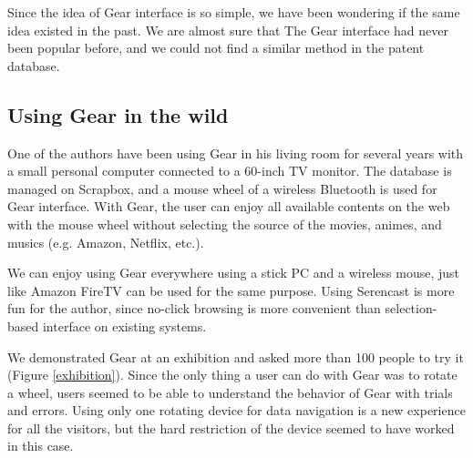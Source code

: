 \documentclass[conference]{IEEEtran}
\def\SC{Serencast}
\def\SB{Scrapbox}
\begin{document}
Since the idea of Gear interface is so simple,
we have been wondering if the same idea existed in the past.
We are almost sure that The Gear interface had never been popular before,
and we could not find a similar method in the patent database.

\subsection{Using Gear in the wild}

One of the authors have been using Gear in his living room for several years
with a small personal computer connected to a 60-inch TV monitor.
The database is managed on {\SB}, and
a mouse wheel of a wireless Bluetooth is used for Gear interface.
With Gear, the user can enjoy all available contents on the web with the mouse wheel
without selecting the source of the movies, animes, and musics (e.g. Amazon, Netflix, etc.).

We can enjoy using Gear everywhere using a stick PC and a wireless mouse,
just like Amazon FireTV can be used for the same purpose.
Using {\SC} is more fun for the author, since no-click browsing is more convenient than
selection-based interface on existing systems.


We demonstrated Gear at an exhibition
and asked more than 100 people to try it
(Figure \ref{exhibition}).
%
Since the only thing a user can do with Gear was to rotate a wheel,
users seemed to be able to understand the behavior of Gear with trials and errors.
% 
% 
Using only one rotating device for data navigation is a new experience for
all the visitors, but the hard restriction of the device seemed to have worked in this case.
\end{document}
